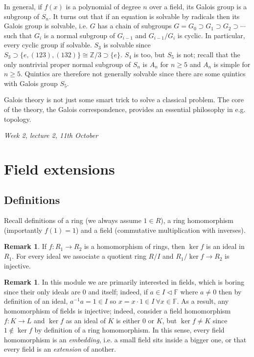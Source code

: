 \documentclass{article}
\newcommand{\F}{\mathbb{F}}
\newcommand{\Z}{\mathbb{Z}}
\theoremstyle{definition}
\newtheorem{remark}[defn]{Remark}
\begin{document}
In general, if $f(x)$ is a polynomial of degree $n$ over a field, its Galois group is a subgroup of $S_n$. It turns out that if an equation is solvable by radicals then its Galois group is solvable, i.e. $G$ has a chain of subgroups $G=G_0\supset G_1\supset G_2\supset\cdots$ such that $G_i$ is a normal subgroup of $G_{i-1}$ and $G_{i-1}/G_i$ is cyclic. In particular, every cyclic group if solvable. $S_3$ is solvable since $S_3\supset\{e,(123),(132)\}\cong\Z/3\supset\{e\}$. $S_4$ is too, but $S_5$ is not; recall that the only nontrivial proper normal subgroup of $S_n$ is $A_n$ for $n\geq 5$ and $A_n$ is simple for $n\geq 5$. Quintics are therefore not generally solvable since there are some quintics with Galois group $S_5$.

Galois theory is not just some smart trick to solve a classical problem. The core of the theory, the Galois correspondence, provides an essential philosophy in e.g. topology.

\begin{flushright}
\textit{Week 2, lecture 2, 11th October}
\end{flushright}

\section{Field extensions}
\subsection{Definitions}
Recall definitions of a ring (we always assume $1\in R$), a ring homomorphism (importantly $f(1)=1$) and a field (commutative multiplication with inverses).
\begin{remark}
If $f:R_1\rightarrow R_2$ is a homomorphism of rings, then $\ker f$ is an ideal in $R_1$. For every ideal we associate a quotient ring $R/I$ and $R_1/\ker f\rightarrow R_2$ is injective.
\end{remark}

\begin{remark}
In this module we are primarily interested in fields, which is boring since their only ideals are $0$ and itself; indeed, if $a\in I\lhd \F$ where $a\neq 0$ then by definition of an ideal, $a^{-1}a=1\in I$ so $x=x\cdot 1\in I \ \forall x\in\F$. As a result, any homomorphism of fields is injective; indeed, consider a field homomorphism $f:K\rightarrow L$ and $\ker f$ as an ideal of $K$ is either 0 or $K$, but $\ker f\neq K$ since $1\notin\ker f$ by definition of a ring homomorphism. In this sense, every field homomorphism is an \textit{embedding}, i.e. a small field sits inside a bigger one, or that every field is an \textit{extension} of another.
\end{remark}
\end{document}
